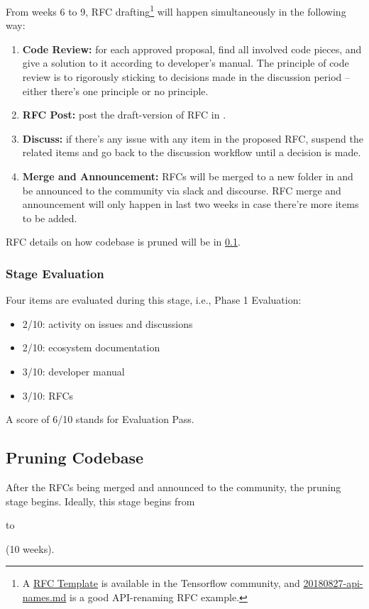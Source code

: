 From weeks 6 to 9, RFC drafting\footnote{A \href{https://github.com/tensorflow/community/blob/master/rfcs/yyyymmdd-rfc-template.md}{RFC Template} is available in the Tensorflow community, and \href{https://github.com/tensorflow/community/blob/master/rfcs/20180827-api-names.md}{20180827-api-names.md} is a good API-renaming RFC example.} will happen simultaneously in the following way:
\begin{enumerate}
    \item \textbf{Code Review:} for each approved proposal, find all involved code pieces, and give a solution to it according to developer's manual. The principle of code review is to rigorously sticking to decisions made in the discussion period -- either there's one principle or no principle.
    \item \textbf{RFC Post:} post the draft-version of RFC in \repogsoctempdoc{}.
    \item \textbf{Discuss:} if there's any issue with any item in the proposed RFC, suspend the related items and go back to the discussion workflow until a decision is made.
    \item \textbf{Merge and Announcement:} RFCs will be merged to a new folder in \repoimagesgithubio{} and be announced to the community via slack and discourse. RFC merge and announcement will only happen in last two weeks in case there're more items to be added.
\end{enumerate}
RFC details on how codebase is pruned will be in \cref{subsec:prune}.

\subsubsection*{Stage Evaluation}

Four items are evaluated during this stage, i.e., \textsf{Phase 1 Evaluation}:
\begin{itemize}
    \item 2/10: activity on issues and discussions
    \item 2/10: ecosystem documentation
    \item 3/10: developer manual
    \item 3/10: RFCs
\end{itemize}
A score of 6/10 stands for \textsf{Evaluation Pass}.

\subsection{Pruning Codebase}\label{subsec:prune}
After the RFCs being merged and announced to the community, the pruning stage begins. Ideally, this stage begins from \date{July 1} to \date{August 26} (10 weeks).

